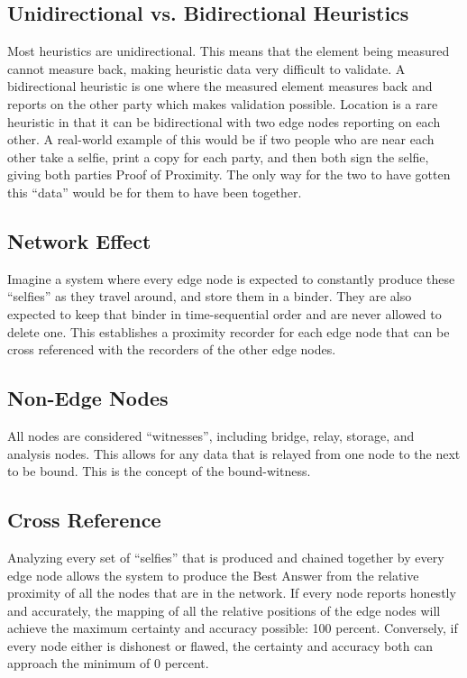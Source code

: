 \documentclass{article}
\begin{document}
\subsection {Unidirectional vs. Bidirectional Heuristics}
Most \glspl{heuristic} are unidirectional. This means that the element being measured cannot measure back, making heuristic data very difficult to validate. A bidirectional heuristic is one where the measured element measures back and reports on the other party which makes validation possible. Location is a rare heuristic in that it can be bidirectional with two edge nodes reporting on each other. A real-world example of this would be if two people who are near each other take a selfie, print a copy for each party, and then both sign the selfie, giving both parties Proof of Proximity. The only way for the two to have gotten this ``data'' would be for them to have been together.

\subsection {Network Effect}
Imagine a system where every edge node is expected to constantly produce these ``selfies'' as they travel around, and store them in a binder. They are also expected to keep that binder in time-sequential order and are never allowed to delete one. This establishes a proximity recorder for each edge node that can be cross referenced with the recorders of the other edge nodes.

\subsection {Non-Edge Nodes}
All nodes are considered ``witnesses'', including bridge, relay, storage, and analysis nodes. This allows for any data that is relayed from one node to the next to be bound. This is the concept of the \Gls{bound-witness}.

\subsection {Cross Reference}
Analyzing every set of ``selfies'' that is produced and chained together by every edge node allows the system to produce the Best Answer from the relative proximity of all the nodes that are in the network. If every node reports honestly and accurately, the mapping of all the relative positions of the edge nodes will achieve the maximum \gls{certainty} and \gls{accuracy} possible: 100 percent. Conversely, if every node either is dishonest or flawed, the certainty and accuracy both can approach the minimum of 0 percent.
\end{document}
